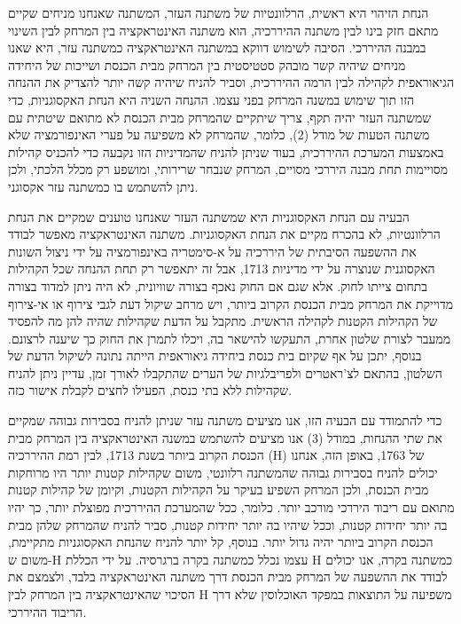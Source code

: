 הנחת הזיהוי היא ראשית, הרלוונטיות של משתנה העזר, המשתנה שאנחנו מניחים שקיים מתאם חזק בינו לבין משתנה ההיררכיה, הוא משתנה האינטראקציה בין המרחק לבין השינוי במבנה ההיררכי. הסיבה לשימוש דווקא במשתנה האינטראקציה כמשתנה עזר, היא שאנו מניחים שיהיה קשר מובהק סטטיסטית בין המרחק מבית הכנסת ושייכות של היחידה הגיאוראפית לקהילה לבין הרמה ההיררכית, וסביר להניח שיהיה קשה יותר להצדיק את ההנחה הזו תוך שימוש במשנה המרחק בפני עצמו. 
	ההנחה השניה היא הנחת האקסוגניות, כדי שמשתנה העזר יהיה תקף, צריך שיתקיים שהמרחק מבית הכנסת לא מתואם שיטתית עם משתנה הטעות של מודל (2), כלומר, שהמרחק לא משפיעה על פערי האינפורמציה שלא באמצעות המערכת ההיררכית, בעוד שניתן להניח שהמדיניות הזו נקבעה כדי להכניס קהילות מסויימות תחת מבנה היררכי מסויים, המרחק שנבחר  שרירותי, ומושפע רק מכלל הלכתי, ולכן ניתן להשתמש בו כמשתנה עזר אקסוגני.
	
הבעיה עם הנחת האקסוגניות היא שמשתנה העזר שאנחנו טוענים שמקיים את הנחת הרלוונטיות, לא בהכרח מקיים את הנחת האקסוגניות. משתנה האינטראקציה מאפשר לבודד את ההשפעה הסיבתית של היררכיה על א-סימטריה באינפורמציה על ידי ניצול השונות האקסוגנית שנוצרה על ידי מדיניות 1713, אבל זה יתאפשר רק תחת ההנחה שכל הקהילות בתחום צייתו לחוק. אלא שגם אם החוק נאכף בצורה שוויונית, לא היה ניתן למדוד בצורה מדוייקת את המרחק מבית הכנסת הקרוב ביותר, ויש מרחב שיקול דעת לגבי צירוף או אי-צירוף של הקהילות הקטנות לקהילה הראשית. מתקבל על הדעת שקהילות שהיה להן מה להפסיד ממעבר לצורת שלטון אחרת, התעקשו להישאר בה, ויכלו לתמרן את החוק כך שיענה לרצונם. בנוסף, יתכן על אף שקיום בית כנסת ביחידה גיאוראפית הייתה נתונה לשיקול הדעת של השלטון, בהתאם לצ'ראטרים ולפריבלגיות של הערים שהתקבלו לאורך זמן, עדיין ניתן להניח שקהילות ללא בתי כנסת, הפעילו לחצים לקבלת אישור כזה. 

כדי להתמודד עם הבעיה הזו, אנו מציעים משתנה עזר שניתן להניח בסבירות גבוהה שמקיים את שתי ההנחות, במודל (3) אנו מציעים להשתמש במשנה האינטראקציה בין המרחק מבית הכנסת הקרוב ביותר בשנת 1713, לבין רמת ההיררכיה (H) של 1763, באופן הזה, אנחנו יכולים להניח בסבירות גבוהה שהמשתנה רלוונטי, משום שקהילות קטנות יותר היו מרוחקות מבית הכנסת, ולכן המרחק השפיע בעיקר על הקהילות הקטנות, וקיומן של קהילות קטנות מתואם עם ריבוד היררכי מורכב יותר. כלומר, ככל שהמערכת ההיררכית מפוצלת יותר, כך יהיו בה יותר יחידות קטנות, וככל שיהיו בה יותר יחידות קטנות, סביר להניח שהמרחק שלהן מבית הכנסת הקרוב ביותר יהיה גדול יותר. 
בנוסף, קל יותר להניח שהנחת האקסוגניות מתקיימת, משום ש-H עצמו נכלל כמשתנה בקרה ברגרסיה. על ידי הכללת H כמשתנה בקרה, אנו יכולים לבודד את ההשפעה של המרחק מבית הכנסת דרך משתנה האינטראקציה בלבד, ולצמצם את הסיכוי שהאינטראקציה בין המרחק לבין H משפיעה על התוצאות במפקד האוכלוסין שלא דרך הריבוד ההיררכי.
	
